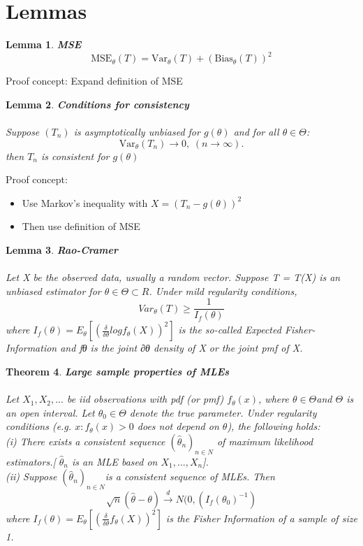 \documentclass{article}
\newtheorem{lemma}{Lemma}
\newtheorem{theorem}[lemma]{Theorem}
\begin{document}
\section*{Lemmas}
\begin{lemma} \textbf{MSE} 
$$
\text{MSE}_\theta(T) = \text{Var}_\theta(T) + (\text{Bias}_\theta(T))^2
$$
\end{lemma}
Proof concept:
Expand definition of MSE
\begin{lemma} \textbf{Conditions for consistency} \\
\\
Suppose $(T_n)$ is asymptotically unbiased for $g(\theta)$ and for all $\theta \in \Theta$:
$$
    \text{Var}_\theta(T_n) \to 0, \hspace{3pt} (n \to \infty).
$$
then $T_n$ is consistent for $g(\theta)$
\end{lemma}
Proof concept:
\begin{itemize}
    \item Use Markov's inequality with $X = (T_n - g(\theta))^2$
    \item Then use definition of MSE
\end{itemize}
\begin{lemma} \textbf{Rao-Cramer} \\
\\
Let X be the observed data, usually a random vector. Suppose T = T(X) is an unbiased estimator for $\theta \in \Theta \subset R$. Under mild regularity conditions,
$$
Var_\theta(T) \geq \frac{1}{I_f(\theta)}
$$
where $I_f (\theta) = E_\theta[(\frac{\delta}{\delta \theta} log f_\theta (X))^2]$ is the so-called Expected Fisher-Information and fθ is the joint ∂θ
density of X or the joint pmf of X.
\end{lemma}
\begin{theorem} \textbf{Large sample properties of MLEs}\\
\\
 Let $X_1, X_2, ...$ be iid observations with pdf (or pmf) $f_\theta(x)$, where $\theta \in \Theta $and $\Theta$ is an open interval. Let $\theta_0 \in \Theta $ denote the true parameter. Under regularity conditions (e.g. ${x : f_\theta(x) > 0}$ does not depend on $\theta$), the following holds: \\
(i) There exists a consistent sequence $(\hat{\theta}_n)_{n \in N}$ of maximum likelihood estimators.[ $\hat{\theta}_n$ is an MLE based on $X_1, ... , X_n$].\\
 (ii) Suppose $(\hat{\theta}_n)_{n \in N} $is a consistent sequence of MLEs. Then $$\sqrt{n}(\hat{\theta} - \theta) \overset{d}{\to} N(0,(I_f (\theta_0)^{-1})$$
where $I_f (\theta) = E_\theta[(\frac{\delta}{\delta \theta} f_\theta (X))^2]$ is the Fisher Information of a sample of size 1.
\end{theorem}
\end{document}
